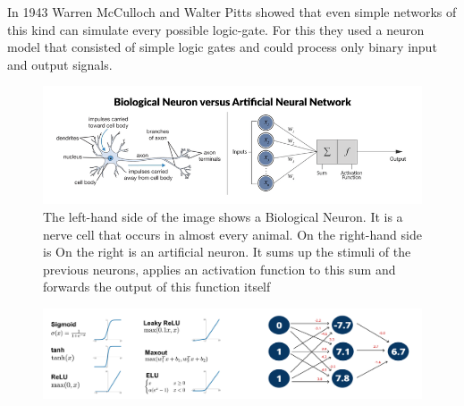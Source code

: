 In 1943 Warren McCulloch and Walter Pitts \cite{mcculloch} showed that even simple networks of this kind can simulate every possible logic-gate. For this they used a neuron model that consisted of simple logic gates and could process only binary input and output signals.

\begin{figure}
	\centering
	\includegraphics[width=1\linewidth]{Figures/chap1/bio_vs_arti_neuron.png}
	\caption[Caption for LOF]{The left-hand side of the image \footnotemark shows a Biological Neuron. It is a nerve cell that occurs in almost every animal. On the right-hand side is On the right is an artificial neuron. It sums up the stimuli of the previous neurons, applies an activation function to this sum and forwards the output of this function itself}
	\label{fig:test1}
\end{figure}


\begin{figure}
	\centering
	\includegraphics[width=\linewidth]{Figures/chap1/ActivFunctionsSimpleANN.png}
	\caption{\todo}
	\label{fig:test1}
\end{figure}


